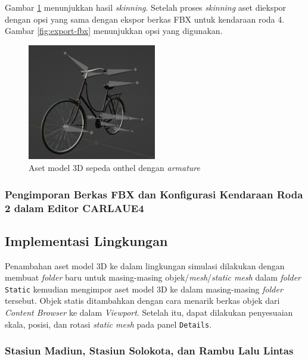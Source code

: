 Gambar \ref{fig:onthel-model-with-armature} menunjukkan hasil \textit{skinning}.
Setelah proses \textit{skinning} aset diekspor dengan opsi yang sama
dengan ekspor berkas FBX untuk kendaraan roda 4. Gambar \ref{fig:export-fbx}
menunjukkan opsi yang digunakan.

\begin{figure}[!h]
    \centering
    \includegraphics[width=0.5\textwidth]{resources/chapter-4/sepeda-onthel-model-2.png}
    \caption{Aset model 3D sepeda onthel dengan \textit{armature}}
    \label{fig:onthel-model-with-armature}
\end{figure}

\subsubsection{Pengimporan Berkas FBX dan Konfigurasi Kendaraan Roda 2 dalam Editor CARLAUE4}


\subsection{Implementasi Lingkungan}

Penambahan aset model 3D ke dalam lingkungan simulasi dilakukan dengan membuat
\textit{folder} baru untuk masing-masing objek/\textit{mesh}/\textit{static
mesh} dalam \textit{folder} \verb|Static| kemudian mengimpor aset model 3D ke
dalam masing-masing \textit{folder} tersebut. Objek statis ditambahkan dengan
cara menarik berkas objek dari \textit{Content Browser} ke dalam
\textit{Viewport}. Setelah itu, dapat dilakukan penyesuaian skala, posisi, dan
rotasi \textit{static mesh} pada panel \verb|Details|.

\subsubsection{Stasiun Madiun, Stasiun Solokota, dan Rambu Lalu Lintas}

